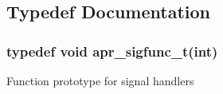 \subsection{Typedef Documentation}
\hypertarget{group__apr__signal_ga2afd99d29d57dc1358aeccedb714368a}{
\subsubsection[{apr\-\_\-sigfunc\-\_\-t}]{\setlength{\rightskip}{0pt plus 5cm}typedef void apr\-\_\-sigfunc\-\_\-t(int)}}\label{group__apr__signal_ga2afd99d29d57dc1358aeccedb714368a}
Function prototype for signal handlers 

